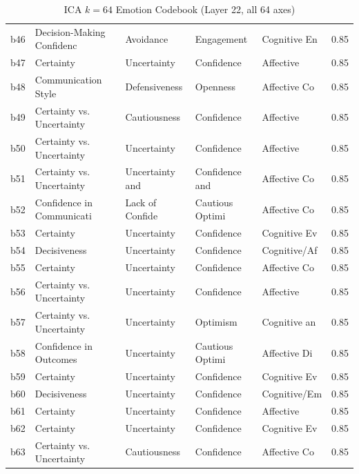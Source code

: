 \begin{table}[H]
\begin{tabular}{|l|l|l|l|l|r|}
b46 & Decision-Making Confidenc & Avoidance & Engagement & Cognitive En & 0.85 \\
b47 & Certainty & Uncertainty & Confidence & Affective & 0.85 \\
b48 & Communication Style & Defensiveness & Openness & Affective Co & 0.85 \\
b49 & Certainty vs. Uncertainty & Cautiousness & Confidence & Affective & 0.85 \\
b50 & Certainty vs. Uncertainty & Uncertainty & Confidence & Affective & 0.85 \\
b51 & Certainty vs. Uncertainty & Uncertainty and & Confidence and  & Affective Co & 0.85 \\
b52 & Confidence in Communicati & Lack of Confide & Cautious Optimi & Affective Co & 0.85 \\
b53 & Certainty & Uncertainty & Confidence & Cognitive Ev & 0.85 \\
b54 & Decisiveness & Uncertainty & Confidence & Cognitive/Af & 0.85 \\
b55 & Certainty & Uncertainty & Confidence & Affective Co & 0.85 \\
b56 & Certainty vs. Uncertainty & Uncertainty & Confidence & Affective & 0.85 \\
b57 & Certainty vs. Uncertainty & Uncertainty & Optimism & Cognitive an & 0.85 \\
b58 & Confidence in Outcomes & Uncertainty & Cautious Optimi & Affective Di & 0.85 \\
b59 & Certainty & Uncertainty & Confidence & Cognitive Ev & 0.85 \\
b60 & Decisiveness & Uncertainty & Confidence & Cognitive/Em & 0.85 \\
b61 & Certainty & Uncertainty & Confidence & Affective & 0.85 \\
b62 & Certainty & Uncertainty & Confidence & Cognitive Ev & 0.85 \\
b63 & Certainty vs. Uncertainty & Cautiousness & Confidence & Affective Co & 0.85 \\
\hline
\end{tabular}
\caption{ICA $k=64$ Emotion Codebook (Layer 22, all 64 axes)}
\label{tab:emotion_codebook}
\end{table}